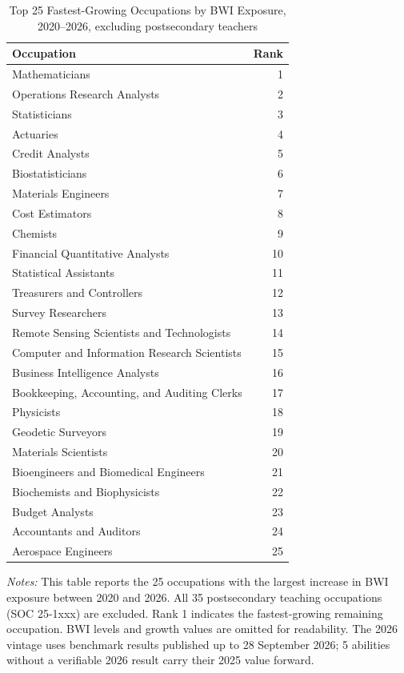 \begin{table}[htbp]\centering
\caption{Top 25 Fastest-Growing Occupations by BWI Exposure, 2020--2026, excluding postsecondary teachers}\label{tab:table_fastest25_no_teachers}
\begin{tabular}{lr}\toprule
Occupation & Rank \\ \midrule
Mathematicians & 1 \\
Operations Research Analysts & 2 \\
Statisticians & 3 \\
Actuaries & 4 \\
Credit Analysts & 5 \\
Biostatisticians & 6 \\
Materials Engineers & 7 \\
Cost Estimators & 8 \\
Chemists & 9 \\
Financial Quantitative Analysts & 10 \\
Statistical Assistants & 11 \\
Treasurers and Controllers & 12 \\
Survey Researchers & 13 \\
Remote Sensing Scientists and Technologists & 14 \\
Computer and Information Research Scientists & 15 \\
Business Intelligence Analysts & 16 \\
Bookkeeping, Accounting, and Auditing Clerks & 17 \\
Physicists & 18 \\
Geodetic Surveyors & 19 \\
Materials Scientists & 20 \\
Bioengineers and Biomedical Engineers & 21 \\
Biochemists and Biophysicists & 22 \\
Budget Analysts & 23 \\
Accountants and Auditors & 24 \\
Aerospace Engineers & 25 \\
\bottomrule\end{tabular}
\begin{minipage}{0.95\linewidth}\footnotesize \textit{Notes:} This table reports the 25 occupations with the largest increase in BWI exposure between 2020 and 2026. All 35 postsecondary teaching occupations (SOC 25-1xxx) are excluded. Rank 1 indicates the fastest-growing remaining occupation. BWI levels and growth values are omitted for readability. The 2026 vintage uses benchmark results published up to 28 September 2026; 5 abilities without a verifiable 2026 result carry their 2025 value forward.\end{minipage}
\end{table}
